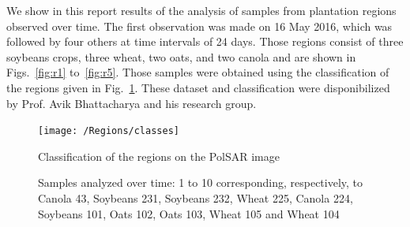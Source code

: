 \documentclass[12pt]{article}
\begin{document}
We show in this report results of the analysis of samples from plantation regions observed over time.
The first observation was made on 16 May 2016, which was followed by four others at time intervals of 24 days. 
Those regions consist of three soybeans crops, three wheat, two oats, and two canola and are shown in Figs.~\ref{fig:r1} to~\ref{fig:r5}. 
Those samples were obtained using the classification of the regions given in Fig.~\ref{fig:classes}. These dataset and classification were disponibilized by Prof. Avik Bhattacharya and his research group.



\begin{figure}[hbt]
  \centering
  \texttt{[image: /Regions/classes]}
  \caption{Classification of the regions on the PolSAR image}
  \label{fig:classes}
\end{figure}

\begin{figure}[hbt]
  \centering
  \caption{Samples analyzed over time: 1 to 10 corresponding, respectively, to Canola 43, Soybeans 231, Soybeans 232, Wheat 225, Canola 224, Soybeans 101, Oats 102, Oats 103, Wheat 105 and Wheat 104}
  \label{fig:regions}
\end{figure}

\end{document}
